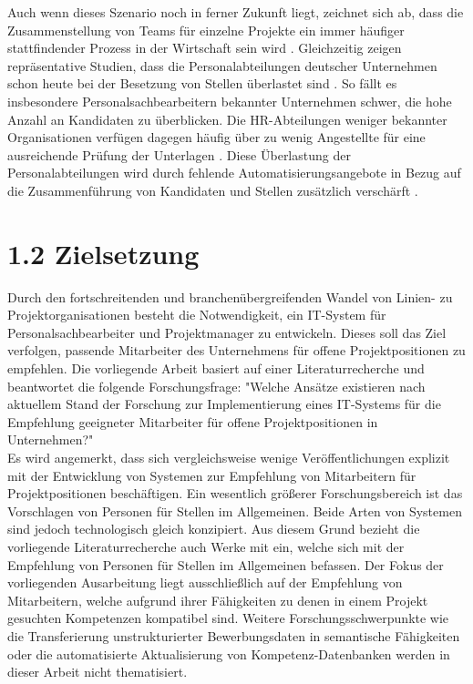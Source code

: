 Auch wenn dieses Szenario noch in ferner Zukunft liegt, zeichnet sich ab, dass die Zusammenstellung von Teams für einzelne Projekte ein immer häufiger stattfindender Prozess in der Wirtschaft sein wird \cite[S. 2]{malinowski:2008}. Gleichzeitig zeigen repräsentative Studien, dass die Personalabteilungen deutscher Unternehmen schon heute bei der Besetzung von Stellen überlastet sind \cite[S. 244]{personalbeschaffung:2017}. So fällt es insbesondere Personalsachbearbeitern bekannter Unternehmen schwer, die hohe Anzahl an Kandidaten zu überblicken. Die HR-Abteilungen weniger bekannter Organisationen verfügen dagegen häufig über zu wenig Angestellte für eine ausreichende Prüfung der Unterlagen \cite[S. 8]{hays:2013}. Diese Überlastung der Personalabteilungen wird durch fehlende Automatisierungsangebote in Bezug auf die Zusammenführung von Kandidaten und Stellen zusätzlich verschärft \cite[S. 15]{hays:2013}.

\section[Zielsetzung]{1.2 Zielsetzung}
\label{sec:intro:zielsetzung}
Durch den fortschreitenden und branchenübergreifenden Wandel von Linien- zu Projektorganisationen besteht die Notwendigkeit, ein IT-System für Personalsachbearbeiter und Projektmanager zu entwickeln. Dieses soll das Ziel verfolgen, passende Mitarbeiter des Unternehmens für offene Projektpositionen zu empfehlen. Die vorliegende Arbeit basiert auf einer Literaturrecherche und beantwortet die folgende Forschungsfrage: "Welche Ansätze existieren nach aktuellem Stand der Forschung zur Implementierung eines IT-Systems für die Empfehlung geeigneter Mitarbeiter für offene Projektpositionen in Unternehmen?"\\
Es wird angemerkt, dass sich vergleichsweise wenige Veröffentlichungen explizit mit der Entwicklung von Systemen zur Empfehlung von Mitarbeitern für Projektpositionen beschäftigen. Ein wesentlich größerer Forschungsbereich ist das Vorschlagen von Personen für Stellen im Allgemeinen. Beide Arten von Systemen sind jedoch technologisch gleich konzipiert. Aus diesem Grund bezieht die vorliegende Literaturrecherche auch Werke mit ein, welche sich mit der Empfehlung von Personen für Stellen im Allgemeinen befassen. Der Fokus der vorliegenden Ausarbeitung liegt ausschließlich auf der Empfehlung von Mitarbeitern, welche aufgrund ihrer Fähigkeiten zu denen in einem Projekt gesuchten Kompetenzen kompatibel sind. Weitere Forschungsschwerpunkte wie die Transferierung unstrukturierter Bewerbungsdaten in semantische Fähigkeiten oder die automatisierte Aktualisierung von Kompetenz-Datenbanken werden in dieser Arbeit nicht thematisiert.
